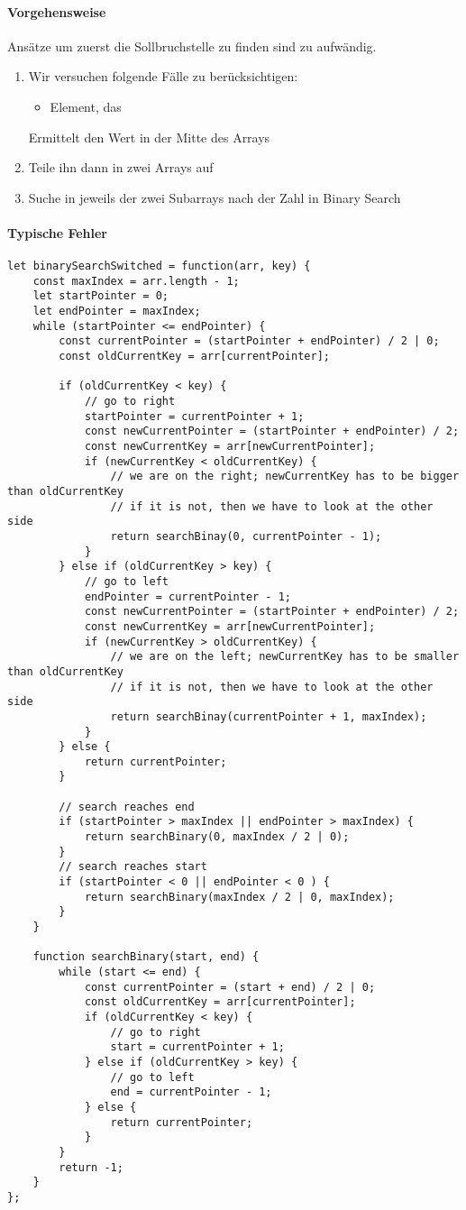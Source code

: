 \documentclass{book}
\begin{document}
\paragraph{Vorgehensweise}
Ansätze um zuerst die Sollbruchstelle zu finden sind zu aufwändig.

\begin{enumerate} 
	\item Wir versuchen folgende Fälle zu berücksichtigen:
	\begin{itemize} 
		\item Element, das 
		
	\end{itemize}
	Ermittelt den Wert in der Mitte des Arrays
	
	
	\item Teile ihn dann in zwei Arrays auf
	\item Suche in jeweils der zwei Subarrays nach der Zahl in Binary Search
\end{enumerate}

\paragraph{Typische Fehler}
\begin{lstlisting}[caption=My Javascript Example]
let binarySearchSwitched = function(arr, key) {
	const maxIndex = arr.length - 1;
	let startPointer = 0;
	let endPointer = maxIndex;
	while (startPointer <= endPointer) {
		const currentPointer = (startPointer + endPointer) / 2 | 0;
		const oldCurrentKey = arr[currentPointer];
		
		if (oldCurrentKey < key) {
			// go to right
			startPointer = currentPointer + 1;
			const newCurrentPointer = (startPointer + endPointer) / 2;
			const newCurrentKey = arr[newCurrentPointer];
			if (newCurrentKey < oldCurrentKey) {
				// we are on the right; newCurrentKey has to be bigger than oldCurrentKey
				// if it is not, then we have to look at the other side
				return searchBinay(0, currentPointer - 1);
			}
		} else if (oldCurrentKey > key) {
			// go to left
			endPointer = currentPointer - 1;
			const newCurrentPointer = (startPointer + endPointer) / 2;
			const newCurrentKey = arr[newCurrentPointer];
			if (newCurrentKey > oldCurrentKey) {
				// we are on the left; newCurrentKey has to be smaller than oldCurrentKey
				// if it is not, then we have to look at the other side
				return searchBinay(currentPointer + 1, maxIndex);
			}
		} else {
			return currentPointer;
		}
	
		// search reaches end
		if (startPointer > maxIndex || endPointer > maxIndex) {
			return searchBinary(0, maxIndex / 2 | 0);
		}
		// search reaches start
		if (startPointer < 0 || endPointer < 0 ) {
			return searchBinary(maxIndex / 2 | 0, maxIndex);
		}
	}

	function searchBinary(start, end) {
		while (start <= end) {
			const currentPointer = (start + end) / 2 | 0;
			const oldCurrentKey = arr[currentPointer];
			if (oldCurrentKey < key) {
				// go to right
				start = currentPointer + 1;
			} else if (oldCurrentKey > key) {
				// go to left
				end = currentPointer - 1;
			} else {
				return currentPointer;
			}
		}
		return -1;
	}
};
\end{lstlisting}
\end{document}
